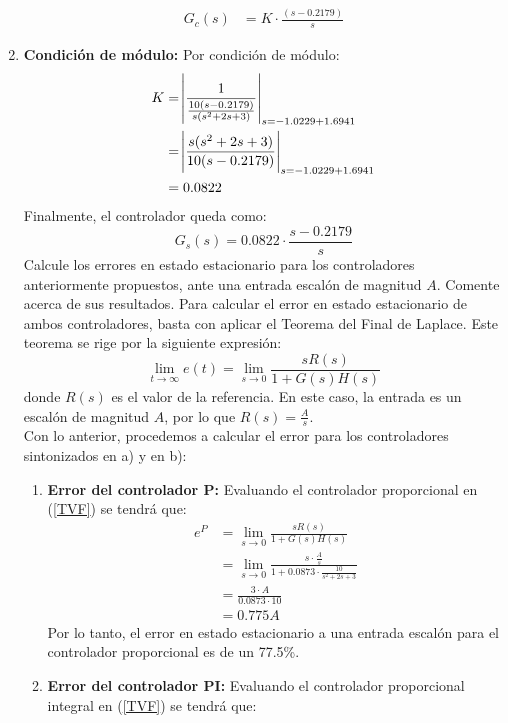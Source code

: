 \documentclass[
  11pt,
  letterpaper,
   addpoints,
   answers
  ]{exam}
\begin{document}
\begin{questions}
\begin{solution}
\begin{enumerate}
    \begin{align}
        G_c(s)&=K\cdot\frac{(s-0.2179)}{s} \nonumber
    \end{align}
    \item \textbf{Condición de módulo: }Por condición de módulo:
    \begin{align}
        K&=\abs{\frac{1}{\frac{10(s-0.2179)}{s(s^2+2s+3)}}}_{s=-1.0229+1.6941} \nonumber \\
        &=\abs{\frac{s(s^2+2s+3)}{10(s-0.2179)}}_{s=-1.0229+1.6941} \nonumber\\
        &=0.0822
    \end{align}
    Finalmente, el controlador queda como:
    \begin{equation}
        \boxed{G_s(s)=0.0822\cdot\frac{s-0.2179}{s}}
    \end{equation}
    Calcule los errores en estado estacionario para los controladores anteriormente propuestos, ante una entrada escalón de magnitud $A$. Comente acerca de sus resultados. 
Para calcular el error en estado estacionario de ambos controladores, basta con aplicar el Teorema del Final de Laplace. Este teorema se rige por la siguiente expresión:
\begin{equation}
    \lim_{t \to \infty}e(t)=\lim_{s \to 0}\frac{sR(s)}{1+G(s)H(s)} \label{TVF}
\end{equation}
donde $R(s)$ es el valor de la referencia. En este caso, la entrada es un escalón de magnitud $A$, por lo que $R(s)=\frac{A}{s}$.\\
Con lo anterior, procedemos a calcular el error para los controladores sintonizados en a) y en b):
\begin{enumerate}
    \item \textbf{Error del controlador P: }Evaluando el controlador proporcional en (\ref{TVF}) se tendrá que:
    \begin{align}
        e^{P}&=\lim_{s\to 0}\frac{s R(s)}{1+G(s)H(s)} \nonumber \\
        &=\lim_{s \to 0} \frac{s \cdot \frac{A}{s}}{1+0.0873\cdot \frac{10}{s^2+2s+3}} \nonumber \\
        &=\frac{3\cdot A}{0.0873\cdot 10} \nonumber \\
        &=0.775 A
    \end{align}
    Por lo tanto, el error en estado estacionario a una entrada escalón para el controlador proporcional es de un 77.5\%.
    \item \textbf{Error del controlador PI: }Evaluando el controlador proporcional integral en (\ref{TVF}) se tendrá que:

\end{enumerate}
\end{enumerate}
\end{solution}
\end{questions}
\end{document}
